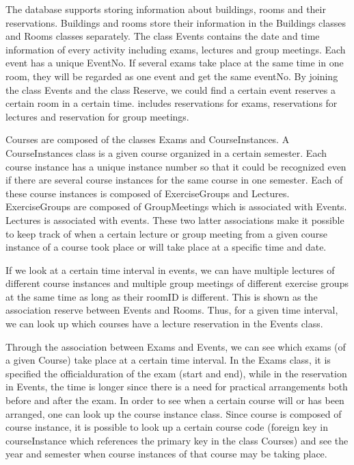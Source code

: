 \documentclass{article}
\begin{document}
The database supports storing information about buildings, rooms and their reservations.
Buildings and rooms store their information in the Buildings classes and Rooms classes
separately. The class Events contains the date and time information of every activity including
exams, lectures and group meetings. Each event has a unique EventNo. If several exams take
place at the same time in one room, they will be regarded as one event and get the same
eventNo. By joining the class Events and the class Reserve, we could find a certain event
reserves a certain room in a certain time. includes reservations for exams, reservations for
lectures and reservation for group meetings.

Courses are composed of the classes Exams and CourseInstances. A CourseInstances class is
a given course organized in a certain semester. Each course instance has a unique instance
number so that it could be recognized even if there are several course instances for the same
course in one semester. Each of these course instances is composed of ExerciseGroups and
Lectures. ExerciseGroups are composed of GroupMeetings which is associated with Events.
Lectures is associated with events. These two latter associations make it possible to keep track
of when a certain lecture or group meeting from a given course instance of a course took
place or will take place at a specific time and date.

If we look at a certain time interval in events, we can have multiple lectures of different course
instances and multiple group meetings of different exercise groups at the same time as long
as their roomID is different. This is shown as the association reserve between Events and
Rooms. Thus, for a given time interval, we can look up which courses have a lecture
reservation in the Events class.

Through the association between Exams and Events, we can see which exams (of a given
Course) take place at a certain time interval. In the Exams class, it is specified the officialduration of the exam (start and end), while in the reservation in Events, the time is longer
since there is a need for practical arrangements both before and after the exam.
In order to see when a certain course will or has been arranged, one can look up the course
instance class. Since course is composed of course instance, it is possible to look up a certain
course code (foreign key in courseInstance which references the primary key in the class
Courses) and see the year and semester when course instances of that course may be taking
place.
\end{document}
